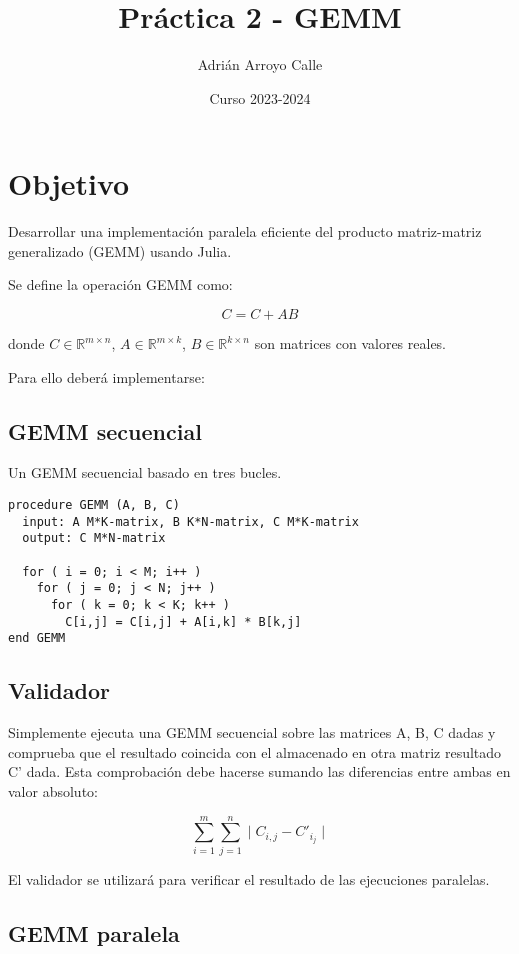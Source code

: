 \documentclass[a4paper]{article}
\author{Adrián Arroyo Calle}
\date{Curso 2023-2024}
\title{Práctica 2 - GEMM}
\begin{document}
\maketitle

\section{Objetivo}
\label{sec:org7de4d88}

Desarrollar una implementación paralela eficiente del producto matriz-matriz generalizado (GEMM) usando Julia.

Se define la operación GEMM como:

$$
C = C + AB
$$

donde \(C \in \mathbb{R}^{m \times n}\), \(A \in \mathbb{R}^{m \times k}\), \(B \in \mathbb{R}^{k \times n}\) son matrices con valores reales.

Para ello deberá implementarse:

\subsection{GEMM secuencial}
\label{sec:org1a6c010}

Un GEMM secuencial basado en tres bucles.

\begin{verbatim}
procedure GEMM (A, B, C)
  input: A M*K-matrix, B K*N-matrix, C M*K-matrix
  output: C M*N-matrix

  for ( i = 0; i < M; i++ )
    for ( j = 0; j < N; j++ )
      for ( k = 0; k < K; k++ )
        C[i,j] = C[i,j] + A[i,k] * B[k,j]
end GEMM
\end{verbatim}

\subsection{Validador}
\label{sec:orgd51ad09}

Simplemente ejecuta una GEMM secuencial sobre las matrices A, B, C dadas
y comprueba que el resultado coincida con el almacenado en otra matriz resultado C'
dada. Esta comprobación debe hacerse sumando las diferencias entre ambas en valor absoluto:

$$
\sum_{i=1}^{m}\sum_{j=1}^{n} \mid C_{i,j} - C'_{i_j} \mid
$$

El validador se utilizará para verificar el resultado
de las ejecuciones paralelas.

\subsection{GEMM paralela}
\label{sec:orgabbbae6}
\end{document}
